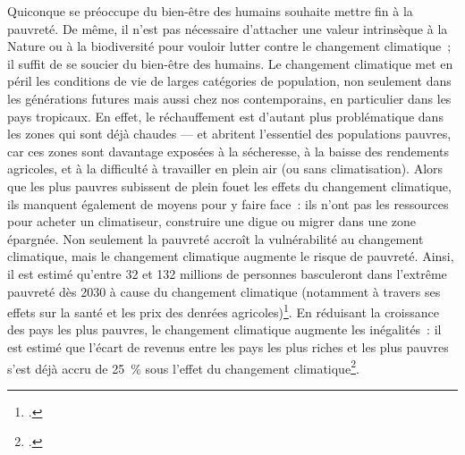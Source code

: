 \documentclass[a5paper,french,openany]{memoir}
\begin{document}
Quiconque se préoccupe du bien-être des humains souhaite mettre fin à la pauvreté. 
De même, il n'est pas nécessaire d'attacher une valeur intrinsèque à la Nature ou à la biodiversité pour vouloir lutter contre le changement climatique~; il suffit de se soucier du bien-être des humains. Le changement climatique met en péril les conditions de vie de larges catégories de population, non seulement dans les générations futures mais aussi chez nos contemporains, %
en particulier dans les pays tropicaux. En effet, le réchauffement est d'autant plus problématique dans les zones qui sont déjà chaudes --- et abritent l'essentiel des populations pauvres, car ces zones sont davantage exposées à la sécheresse, à la baisse des rendements agricoles, et à la difficulté à travailler en plein air (ou sans climatisation). Alors que les plus pauvres subissent de plein fouet les effets du changement climatique, ils manquent également de moyens pour y faire face~: %
ils n'ont pas les ressources pour acheter un climatiseur, construire une digue ou migrer dans une zone épargnée. Non seulement la pauvreté accroît la vulnérabilité au changement climatique, mais le changement climatique augmente le risque de pauvreté. Ainsi, il est estimé qu'entre 32 et 132 millions de personnes basculeront dans l'extrême pauvreté dès 2030 à cause du changement climatique (notamment à travers ses effets sur la santé et les prix des denrées agricoles)\footnote{\cite{jafino_revised_2020}.}. En réduisant la croissance des pays les plus pauvres, le changement climatique augmente les inégalités~: il est estimé que l'écart de revenus entre les pays les plus riches et les plus pauvres s'est déjà accru de 25~\% sous l'effet du changement climatique\footnote{\cite{diffenbaugh_global_2019,khalfan_climate_2023}.}. %

\end{document}
